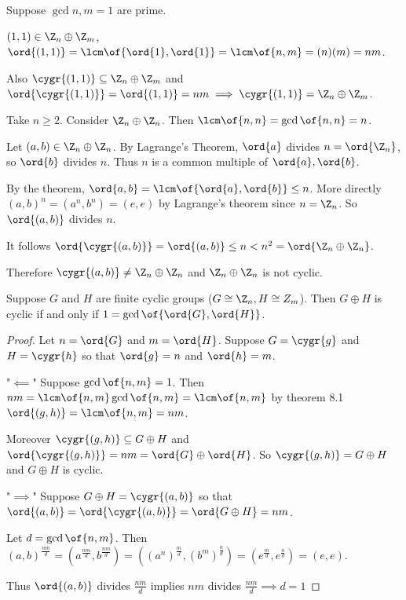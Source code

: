 \begin{example}
    Suppose $\gcd{n,m} = 1$ are prime.

    $(1,1) \in \Z_n \oplus \Z_m$, $\ord{(1,1)} = \lcm\of{\ord{1}, \ord{1}} = \lcm\of{n,m} = (n)(m) = nm$.

    Also $\cygr{(1,1)} \subseteq \Z_n \oplus \Z_m$ and $\ord{\cygr{(1,1)}} = \ord{(1,1)} = nm \implies \cygr{(1,1)} = \Z_n \oplus \Z_m$.
\end{example}

\begin{example}
    Take $n \geq 2$. Consider $\Z_n \oplus \Z_n$. Then $\lcm\of{n,n} = \gcd\of{n,n} = n$.

    Let $(a,b) \in \Z_n \oplus \Z_n$. By Lagrange's Theorem, $\ord{a}$ divides $n = \ord{\Z_n}$, so $\ord{b}$ divides $n$.
    Thus $n$ is a common multiple of $\ord{a}, \ord{b}$.

    By the theorem, $\ord{a,b} = \lcm\of{\ord{a}, \ord{b}} \leq n$. More directly $(a,b)^n = (a^n, b^n) = (e,e)$ by Lagrange's theorem since $n = \Z_n$. So $\ord{(a,b)}$ divides $n$.

    It follows $\ord{\cygr{(a,b)}} = \ord{(a,b)} \leq n < n^2 = \ord{\Z_n \oplus \Z_n}$.

    Therefore $\cygr{(a,b)} \neq \Z_n \oplus \Z_n$ and $\Z_n \oplus \Z_n$ is not cyclic.
\end{example}

\begin{theorem}
    Suppose $G$ and $H$ are finite cyclic groups ($G \cong \Z_n, H \cong Z_m$). Then $G \oplus H$ is cyclic if and only if $1 = \gcd\of{\ord{G}, \ord{H}}$.
\end{theorem}
\begin{proof}
    Let $n = \ord{G}$ and $m = \ord{H}$. Suppose $G = \cygr{g}$ and $H = \cygr{h}$ so that $\ord{g} = n$ and $\ord{h} = m$.

    "$\impliedby$" Suppose $\gcd\of{n,m} = 1$. Then $nm = \lcm\of{n,m} \gcd\of{n,m} = \lcm\of{n,m}$ by theorem 8.1 $\ord{(g,h)} = \lcm\of{n,m} = nm$.

    Moreover $\cygr{(g,h)} \subseteq G \oplus H$ and $\ord{\cygr{(g,h)}} = nm = \ord{G} \oplus \ord{H}$. So $\cygr{(g,h)} = G \oplus H$ and $G \oplus H$ is cyclic.

    "$\implies$" Suppose $G \oplus H = \cygr{(a,b)}$ so that $\ord{(a,b)} = \ord{\cygr{(a,b)}} = \ord{G \oplus H} = nm$.

    Let $d = \gcd\of{n,m}$. Then $(a,b)^{\frac{nm}{d}} = \left(a^{\frac{nm}{d}}, b^{\frac{nm}{d}}\right) = \left(\left(a^n\right)^{\frac{m}{d}}, \left(b^m\right)^{\frac{n}{d}}\right) = \left( e^{\frac{m}{d}}, e^{\frac{n}{d}}\right) = (e,e)$.

    Thus $\ord{(a,b)}$ divides $\frac{nm}{d}$ implies $nm$ divides $\frac{nm}{d} \implies d = 1$
\end{proof}

